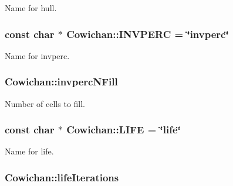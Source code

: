 Name for hull. \hypertarget{class_cowichan_0665b5094fb551e4f000502ec752a4e8}{
\subsubsection[{INVPERC}]{\setlength{\rightskip}{0pt plus 5cm}const char $\ast$ {\bf Cowichan::INVPERC} = \char`\"{}invperc\char`\"{}}}
\label{class_cowichan_0665b5094fb551e4f000502ec752a4e8}


Name for invperc. \hypertarget{class_cowichan_c637b7380ab889ed42652790a3c542c6}{
\subsubsection[{invpercNFill}]{ {\bf Cowichan::invpercNFill}}}
\label{class_cowichan_c637b7380ab889ed42652790a3c542c6}


Number of cells to fill. \hypertarget{class_cowichan_6d8355328c9a2e36321d3d33930f56b2}{
\subsubsection[{LIFE}]{\setlength{\rightskip}{0pt plus 5cm}const char $\ast$ {\bf Cowichan::LIFE} = \char`\"{}life\char`\"{}}}
\label{class_cowichan_6d8355328c9a2e36321d3d33930f56b2}


Name for life. \hypertarget{class_cowichan_edeb55a8b961f270ec35869dbba3afde}{
\subsubsection[{lifeIterations}]{ {\bf Cowichan::lifeIterations}}}
\label{class_cowichan_edeb55a8b961f270ec35869dbba3afde}


